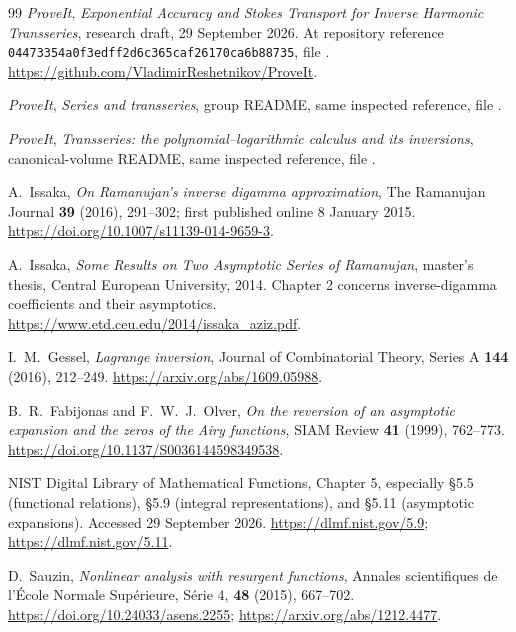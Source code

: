 \documentclass[11pt,a4paper]{article}
\theoremstyle{definition}
\numberwithin{equation}{section}
\newcommand{\repo}{\textit{ProveIt}}
\begin{document}
\clearpage
\begin{thebibliography}{99}
\repo, \emph{Exponential Accuracy and Stokes Transport for Inverse Harmonic Transseries}, research draft, 29 September 2026.
At repository reference \texttt{04473354a0f3edff2d6c365caf26170ca6b88735}, file
.
\url{https://github.com/VladimirReshetnikov/ProveIt}.

\repo, \emph{Series and transseries}, group README, same inspected reference, file
.

\repo, \emph{Transseries: the polynomial--logarithmic calculus and its inversions}, canonical-volume README, same inspected reference, file
.

A.~Issaka, \emph{On Ramanujan's inverse digamma approximation}, The Ramanujan Journal \textbf{39} (2016), 291--302; first published online 8 January 2015.
\url{https://doi.org/10.1007/s11139-014-9659-3}.

A.~Issaka, \emph{Some Results on Two Asymptotic Series of Ramanujan}, master's thesis, Central European University, 2014. Chapter 2 concerns inverse-digamma coefficients and their asymptotics.
\url{https://www.etd.ceu.edu/2014/issaka_aziz.pdf}.

I.~M.~Gessel, \emph{Lagrange inversion}, Journal of Combinatorial Theory, Series A \textbf{144} (2016), 212--249.
\url{https://arxiv.org/abs/1609.05988}.

B.~R.~Fabijonas and F.~W.~J.~Olver, \emph{On the reversion of an asymptotic expansion and the zeros of the Airy functions}, SIAM Review \textbf{41} (1999), 762--773.
\url{https://doi.org/10.1137/S0036144598349538}.

NIST Digital Library of Mathematical Functions, Chapter 5, especially \S5.5 (functional relations), \S5.9 (integral representations), and \S5.11 (asymptotic expansions). Accessed 29 September 2026.
\url{https://dlmf.nist.gov/5.9}; \url{https://dlmf.nist.gov/5.11}.

D.~Sauzin, \emph{Nonlinear analysis with resurgent functions}, Annales scientifiques de l'\'Ecole Normale Sup\'erieure, S\'erie 4, \textbf{48} (2015), 667--702.
\url{https://doi.org/10.24033/asens.2255}; \url{https://arxiv.org/abs/1212.4477}.
\end{thebibliography}
\end{document}
